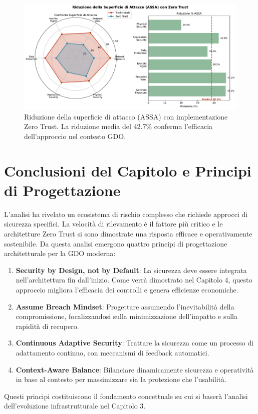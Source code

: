 \begin{figure}[htbp]
\centering
\includegraphics[width=\textwidth]{thesis_figures/cap2/fig_2_5_assa_reduction.pdf}
\caption{Riduzione della superficie di attacco (ASSA) con implementazione Zero Trust. La riduzione media del 42.7\% conferma l'efficacia dell'approccio nel contesto GDO.}
\label{fig:assa_reduction}
\end{figure}

\section{Conclusioni del Capitolo e Principi di Progettazione}
L'analisi ha rivelato un ecosistema di rischio complesso che richiede approcci di sicurezza specifici. La velocità di rilevamento è il fattore più critico e le architetture Zero Trust si sono dimostrate una risposta efficace e operativamente sostenibile. Da questa analisi emergono quattro principi di progettazione architetturale per la GDO moderna:
\begin{enumerate}
    \item \textbf{Security by Design, not by Default}: La sicurezza deve essere integrata nell'architettura fin dall'inizio. Come verrà dimostrato nel Capitolo 4, questo approccio migliora l'efficacia dei controlli e genera efficienze economiche.
    \item \textbf{Assume Breach Mindset}: Progettare assumendo l'inevitabilità della compromissione, focalizzandosi sulla minimizzazione dell'impatto e sulla rapidità di recupero.
    \item \textbf{Continuous Adaptive Security}: Trattare la sicurezza come un processo di adattamento continuo, con meccanismi di feedback automatici.
    \item \textbf{Context-Aware Balance}: Bilanciare dinamicamente sicurezza e operatività in base al contesto per massimizzare sia la protezione che l'usabilità.
\end{enumerate}

Questi principi costituiscono il fondamento concettuale su cui si baserà l'analisi dell'evoluzione infrastrutturale nel Capitolo 3.

\clearpage
\printbibliography[
    heading=subbibliography,
    title={Riferimenti Bibliografici del Capitolo 2},
]

\endrefsection
